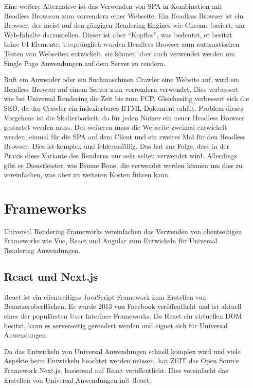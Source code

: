 \documentclass[runningheads]{llncs}
\begin{document}
Eine weitere Alternative ist das Verwenden von SPA in Kombination mit Headless Browsern zum vorrendern einer Webseite. 
Ein Headless Browser ist ein Browser, 
der meist auf den gängigen Rendering-Engines wie Chrome basiert, 
um Web-Inhalte darzustellen. Dieser ist aber “Kopflos”, was bedeutet, 
er besitzt keine UI Elemente. 
Ursprünglich wurden Headless Browser zum automatischen Testen von Webseiten entwickelt, 
sie können aber auch verwendet werden um Single Page Anwendungen auf dem Server zu rendern. 

Ruft ein Anwender oder ein Suchmaschinen Crawler eine Website auf, 
wird ein Headless Browser auf einem Server zum vorrendern verwendet. 
Dies verbessert wie bei Universal Rendering die Zeit bis zum FCP. Gleichzeitig verbessert sich die SEO, da der Crawler ein indexierbares HTML Dokument erhält. 
Problem dieses Vorgehens ist die Skalierbarkeit, 
da für jeden Nutzer ein neuer Headless Browser gestartet werden muss. 
Des weiteren muss die Webseite zweimal entwickelt werden, 
einmal für die SPA auf dem Client und ein zweites Mal für den Headless Browser. 
Dies ist komplex und fehleranfällig. Das hat zur Folge, 
dass in der Praxis diese Variante des Renderns nur sehr selten verwendet wird. 
Allerdings gibt es Dienstleister, wie Brome Bone, 
die verwendet werden können um dies zu vereinfachen, 
was aber zu weiteren Kosten führen kann.

\newpage

\section{Frameworks}
\label{sec:Evaluation}
Universal Rendering Frameworks vereinfachen das Verwenden von clientseitigen Frameworks wie Vue, 
React und Angular zum Entwickeln für Universal Rendering Anwendungen. 

\subsection{React und Next.js}
\label{subsec:React und Next.js}
React ist ein clientseitiges JavaScript Framework zum Erstellen von Benutzeroberflächen. 
Es wurde 2013 von Facebook veröffentlicht und ist aktuell eines der populärsten User Interface Frameworks. 
Da React ein virtuellen DOM besitzt, 
kann es serverseitig gerendert werden und eignet sich für Universal Anwendungen.

Da das Entwickeln von Universal Anwendungen schnell komplex wird und 
viele Aspekte beim Entwickeln beachtet werden müssen, 
hat ZEIT das Open Source Framework Next.js, 
basierend auf React veröffentlicht. 
Dies vereinfacht das Erstellen von Universal Anwendungen mit React.
\end{document}
